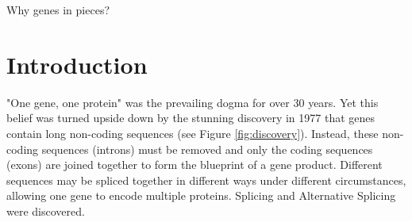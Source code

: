 \begin{savequote}[8cm]
Why genes in pieces?
\end{savequote}

\chapter{\label{ch:1-intro}Introduction} 
"One gene, one protein" was the prevailing dogma for over 30 years. Yet this belief was turned upside down by the stunning discovery in 1977 that genes contain long non-coding sequences \cite{discoveryofsplicing} (see Figure \ref{fig:discovery}). Instead, these non-coding sequences (introns) must be removed and only the coding sequences (exons) are joined together to form the blueprint of a gene product. Different sequences may be spliced together in different ways under different circumstances, allowing one gene to encode multiple proteins. Splicing and Alternative Splicing were discovered. 

%

